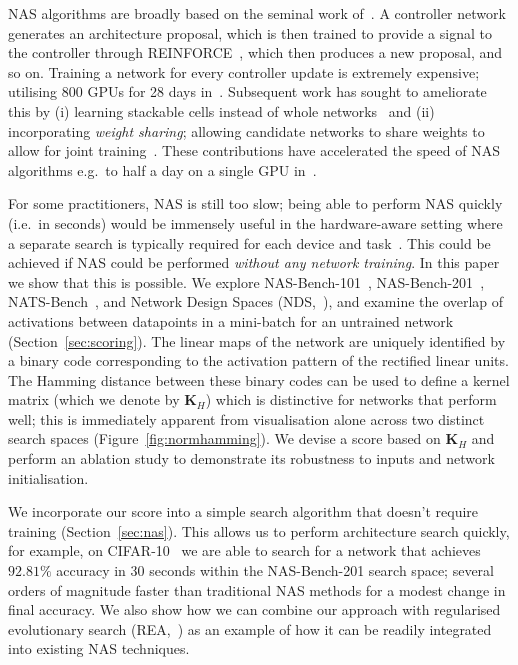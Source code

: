 \documentclass{article}
\newcommand{\maybebf}[0]{}
\newcommand{\matr}[1]{\mathbf{#1}}
\begin{document}
NAS algorithms are broadly based on the seminal work of~\cite{zoph2017neural}. A controller network generates an architecture proposal, which is then trained to provide a signal to the controller through REINFORCE~\citep{williams1992simple}, which then produces a new proposal, and so on. Training a network for every controller update is extremely expensive; utilising 800 GPUs for 28 days in~\cite{zoph2017neural}. Subsequent work has sought to ameliorate this by (i) learning stackable cells instead of whole networks~\citep{zoph2018learning} and (ii) incorporating {\it weight sharing}; allowing candidate networks to share weights to allow for joint training~\citep{pham2018efficient}. These contributions have accelerated the speed of NAS algorithms e.g.\ to half a day on a single GPU in~\cite{pham2018efficient}.

For some practitioners, NAS is still too slow; being able to perform NAS quickly (i.e.\ in seconds) would be immensely useful in the hardware-aware setting where a separate search is typically required for each device and task~\citep{wu2019fbnet,tan2019mnasnet}. This could be achieved if NAS could be performed {\it without any network training}. In this paper {\maybebf we show that this is possible}. We explore NAS-Bench-101~\citep{ying2019bench}, NAS-Bench-201~\citep{Dong2020NAS-Bench-201}, NATS-Bench~\citep{dong2021nats}, and Network Design Spaces (NDS,~\citealp{radosavovic2019network}), and examine the overlap of activations between datapoints in a mini-batch for an {\maybebf untrained} network (Section~\ref{sec:scoring}). The linear maps of the network are uniquely identified by a binary code corresponding to the activation pattern of the rectified linear units. The Hamming distance between these binary codes can be used to define a kernel matrix (which we denote by $\matr{K}_H$) which is distinctive for networks that perform well; this is immediately apparent from visualisation alone across two distinct search spaces (Figure~\ref{fig:normhamming}). We devise a score based on $\matr{K}_H$ and perform an ablation study to demonstrate its robustness to inputs and network initialisation.

We incorporate our score into a simple search algorithm that {\maybebf doesn't require training} (Section~\ref{sec:nas}). This allows us to perform architecture search quickly, for example, on CIFAR-10~\citep{krizhevsky2009learning} we are able to search for a network that achieves $92.81\%$ accuracy in 30 seconds within the NAS-Bench-201 search space; several orders of magnitude faster than traditional NAS methods for a modest change in final accuracy. We also show how we can combine our approach with regularised evolutionary search (REA,~\citealp{pham2018efficient}) as an example of how it can be readily integrated into existing NAS techniques.
\end{document}
